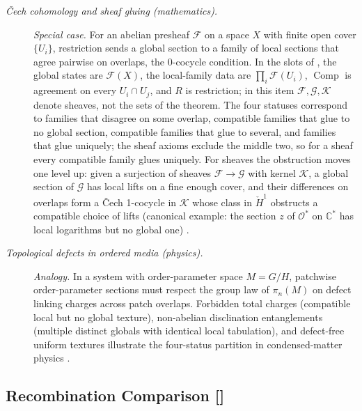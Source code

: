 \begingroup\small
\begin{description}
\item[\emph{\v{C}ech cohomology and sheaf gluing (mathematics).}] \textit{Special case.}
For an abelian presheaf \(\mathcal F\) on a space \(X\) with finite
open cover \(\{U_i\}\), restriction sends a global section to a family
of local sections that agree pairwise on overlaps, the 0-cocycle
condition. In the slots of , the global states are \(\mathcal F(X)\), the local-family data are \(\prod_i\mathcal F(U_i)\), \(\operatorname{Comp}\) is agreement on every \(U_i\cap U_j\), and \(R\) is restriction; in this item \(\mathcal F,\mathcal G,\mathcal K\) denote sheaves, not the sets of the theorem.  The four  statuses correspond to families that
disagree on some overlap, compatible families that glue to no global
section, compatible families that glue to several, and families that
glue uniquely; the sheaf axioms exclude the middle two, so for a
sheaf every compatible family glues uniquely.  For sheaves the
obstruction moves one level up: given a surjection of sheaves
\(\mathcal F\to\mathcal G\) with kernel \(\mathcal K\), a global
section of \(\mathcal G\) has local lifts on a fine enough cover, and
their differences on overlaps form a \v{C}ech 1-cocycle in
\(\mathcal K\) whose class in \(\check H^1\) obstructs a compatible
choice of lifts (canonical example: the section \(z\) of
\(\mathcal O^*\) on \(\mathbb C^*\) has local logarithms but no global
one)
\citep{Hartshorne1977AlgebraicGeometry}.

\item[\emph{Topological defects in ordered media (physics).}] \textit{Analogy.}
In a system with order-parameter space \(M = G/H\), patchwise
order-parameter sections must respect the group law of \(\pi_n(M)\)
on defect linking charges across patch overlaps.  Forbidden total
charges (compatible local but no global texture), non-abelian
disclination entanglements (multiple distinct globals with
identical local tabulation), and defect-free uniform textures
illustrate the four-status partition in condensed-matter physics
\citep{Mermin1979TopologicalDefects}.

\end{description}
\endgroup


\subsection{Recombination Comparison [\texorpdfstring{}{F5}]}\label{sec:transport:recombination}

